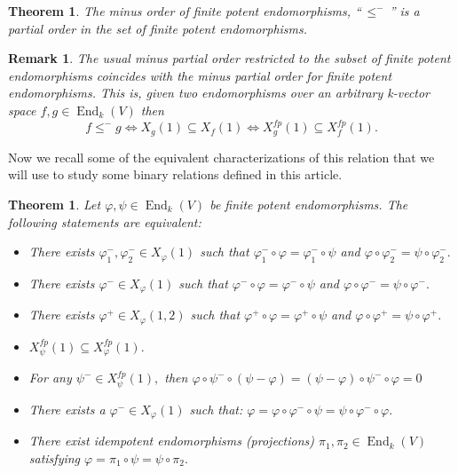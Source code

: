 \documentclass[10pt,a4paper]{amsart}
\newtheorem{thm}[defn]{Theorem}
\theoremstyle{plain}
\newtheorem{rem}[defn]{Remark}
\theoremstyle{remark}
\numberwithin{equation}{section} \numberwithin{defn}{section}
\newcommand\ed{\operatorname{End}}
\newcommand{\f}{\varphi}
\newcommand{\g}{\psi}
\begin{document}
\begin{thm}\cite[Theorem 4.2]{MinusDaa}\label{T: Minus is PO FP}
The minus order of finite potent endomorphisms, ``$\, \leq^{-} \,$'' is a partial order in the set of finite potent endomorphisms.
\end{thm}

\begin{rem}\cite[Remark 4.4]{MinusDaa}\label{R: MinusCoinciden}
The usual minus partial order restricted to the subset of finite potent endomorphisms coincides with the minus partial order for finite potent endomorphisms. This is, given two endomorphisms over an arbitrary k-vector space $f, g \in \ed_k(V)$ then $$f\leq^- g \Longleftrightarrow X_{g}(1)\subseteq X_{f}(1) \Longleftrightarrow X_{g}^{fp}(1)\subseteq X_{f}^{fp}(1). $$
\end{rem}

Now we recall some of the equivalent characterizations of this relation that we will use to study some binary relations defined in this article.

\begin{thm}\cite[Theorem 4.5]{MinusDaa}\label{T: Equiv Minus FP}
Let $\f, \g \in \ed_k(V)$ be finite potent endomorphisms. The following statements are equivalent: \begin{itemize}
\item[I.)] There exists $\f_1^{-},\f^{-}_2 \in X_{\f}(1)$ such that $\f^{-}_1\circ \f = \f^{-}_1\circ \g$ and $\f\circ \f^{-}_2=\g\circ \f^{-}_2.$ 
\item[II.)] There exists $\f^{-}\in X_{\f}(1)$ such that $\f^-\circ \f=\f^-\circ \g$ and $\f \circ \f^-=\g\circ \f^-.$ 
\item [II'.)]There exists $\f^+\in X_{\f}(1,2)$ such that $\f^+\circ \f=\f^+\circ \g$ and $\f \circ \f^+=\g\circ \f^+.$ 
\item[III.)] $X_{\g}^{fp}(1)\subseteq X_{\f}^{fp}(1).$ 
\item[IV.)]For any $\g^-\in X_{\g}^{fp}(1),$ then $\f\circ \g^{-}\circ (\g-\f) =(\g-\f)\circ \g^{-}\circ \f=0$ 
\item[V.)] There exists a $\f^- \in X_{\f}(1)$ such that: $\f=\f\circ\f^-\circ \g=\g\circ \f^-\circ\f.$ 
\item[VI.)] There exist idempotent endomorphisms (projections) $\pi_1 , \pi_2 \in \ed_k(V)$ satisfying $\f=\pi_1 \circ \g = \g\circ \pi_2.$ 
\end{itemize}
\end{thm}
\end{document}
